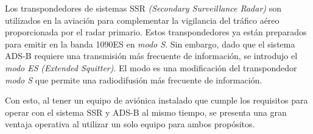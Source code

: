 \documentclass[a4paper, 11pt]{book}
\begin{document}
Los transpondedores de sistemas \textsc{\gls{SSR}} \emph{(Secondary Surveillance Radar)} son utilizados en la aviación para complementar la vigilancia del tráfico aéreo proporcionada por el radar primario. Estos transpondedores ya están preparados para emitir en la banda \textsc{1090ES} en \emph{\gls{modo S}}. Sin embargo, dado que el sistema \textsc{ADS-B} requiere una transmisión más frecuente de información, se introdujo el \emph{modo ES} \emph{(Extended Squitter)}. El modo es una modificación del transpondedor \emph{\gls{modo S}} que permite una radiodifusión más frecuente de información.

Con esto, al tener un equipo de aviónica instalado que cumple los requisitos para operar con el sistema \textsc{\gls{SSR}} y \textsc{ADS-B} al mismo tiempo, se presenta una gran ventaja operativa al utilizar un solo equipo para ambos propósitos.
\end{document}
